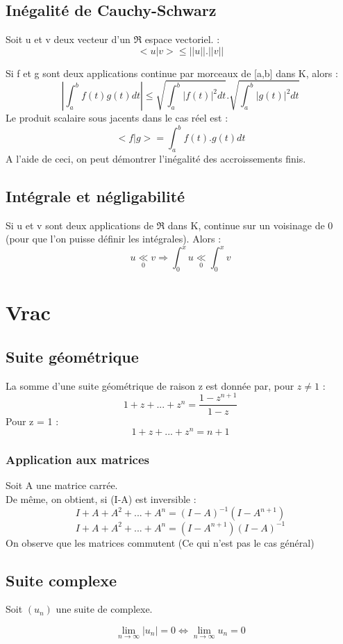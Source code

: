 \subsection{Inégalité de Cauchy-Schwarz}
\begin{enon}
Soit u et v deux vecteur d'un $\Re$ espace vectoriel. :
$$<u|v> \leq ||u||.||v||$$
\end{enon}
\begin{prop}
Si f et g sont deux applications continue par morceaux de [a,b] dans K, alors :
$$|\int_a^b f(t)g(t)dt| \leq \sqrt{\int_a^b |f(t)|^2dt}.\sqrt{\int_a^b |g(t)|^2dt}$$
Le produit scalaire sous jacents dans le cas réel est : 
$$<f|g> = \int_a^b f(t).g(t) dt$$
A l'aide de ceci, on peut démontrer l'inégalité des accroissements finis.
\end{prop}
\subsection{Intégrale et négligabilité}
\begin{prop}
Si u et v sont deux applications de $\Re$ dans K, continue sur un voisinage de 0 (pour que l'on puisse définir les intégrales). Alors :
$$u \underset{0}\ll v \Rightarrow  \int_0^x u \underset{0}\ll \int_0^x v$$
\end{prop}
\section{Vrac}
\subsection{Suite géométrique}
\begin{prop}
La somme d'une suite géométrique de raison z est donnée par, pour $z \neq 1$ :
$$1+z+...+z^n = \dfrac{1-z^{n+1}}{1-z}$$
Pour z = 1 : 
$$1+z+...+z^n = n+1$$
\end{prop}
\subsubsection{Application aux matrices}
Soit A une matrice carrée.\\
De même, on obtient, si (I-A) est inversible :
$$I + A + A^2 + ... + A^n = (I-A)^{-1}(I-A^{n+1})$$
$$I + A + A^2 + ... + A^n = (I-A^{n+1})(I-A)^{-1}$$
On observe que les matrices commutent (Ce qui n'est pas le cas général)
\subsection{Suite complexe}
Soit $(u_n)$ une suite de complexe.
\begin{prop}
$$\lim_{n \rightarrow \infty} |u_n| = 0 \Leftrightarrow \lim_{n \rightarrow \infty} u_n = 0$$
\end{prop}
